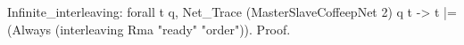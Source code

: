 Infinite_interleaving:
  forall t q,
   Net_Trace (MasterSlaveCoffeepNet 2) q t ->
   t |= (Always (interleaving Rma "ready" "order")).
Proof.